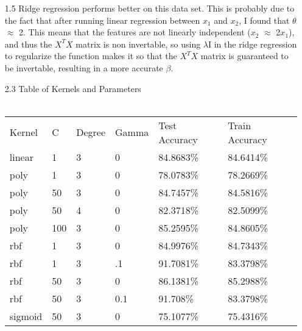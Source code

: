 \documentclass{article}
\begin{document}
\begin{enumerate}
\item[1.5]
Ridge regression performs better on this data set. This is probably due to the fact that after running linear regression between $x_1$ and $x_2$, I found that $\theta$ $\approx$ 2. This means that the features are not linearly independent ($x_2$ $\approx$ 2$x_1$), and thus the $X^TX$ matrix is non invertable, so using $\lambda$I in the ridge regression to regularize the function makes it so that the $X^TX$ matrix is guaranteed to be invertable, resulting in a more accurate $\beta$.
\\
\item[2.3]
Table of Kernels and Parameters\\\\
\begin{tabular}{llllll}
Kernel  & C   & Degree & Gamma & Test Accuracy & Train Accuracy \\
linear  & 1   & 3      & 0     & 84.8683\%     & 84.6414\%      \\
poly    & 1   & 3      & 0     & 78.0783\%     & 78.2669\%      \\
poly    & 50  & 3      & 0     & 84.7457\%     & 84.5816\%      \\
poly    & 50  & 4      & 0     & 82.3718\%     & 82.5099\%      \\
poly    & 100 & 3      & 0     & 85.2595\%     & 84.8605\%      \\
rbf     & 1   & 3      & 0     & 84.9976\%     & 84.7343\%      \\
rbf     & 1   & 3      & .1    & 91.7081\%     & 83.3798\%      \\
rbf     & 50  & 3      & 0     & 86.1381\%     & 85.2988\%      \\
rbf     & 50  & 3      & 0.1   & 91.708\%      & 83.3798\%      \\
sigmoid & 50  & 3      & 0     & 75.1077\%     & 75.4316\%     
\end{tabular}

\end{enumerate}
\end{document}
